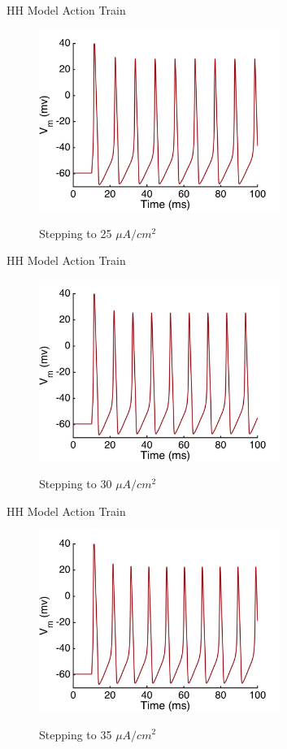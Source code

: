 \documentclass{beamer}
\begin{document}
\begin{frame}{HH Model Action Train}
  \begin{figure}
    \centering
    \includegraphics[width = 0.7\textwidth]{./images/current_0_25.jpg}

    Stepping to 25 $\mu A/cm^2$
  \end{figure}
\end{frame}


\begin{frame}{HH Model Action Train}
  \begin{figure}
    \centering
    \includegraphics[width = 0.7\textwidth]{./images/current_0_30.jpg}

    Stepping to 30 $\mu A/cm^2$
  \end{figure}
\end{frame}


\begin{frame}{HH Model Action Train}
  \begin{figure}
    \centering
    \includegraphics[width = 0.7\textwidth]{./images/current_0_35.jpg}

    Stepping to 35 $\mu A/cm^2$
  \end{figure}
\end{frame}
\end{document}
